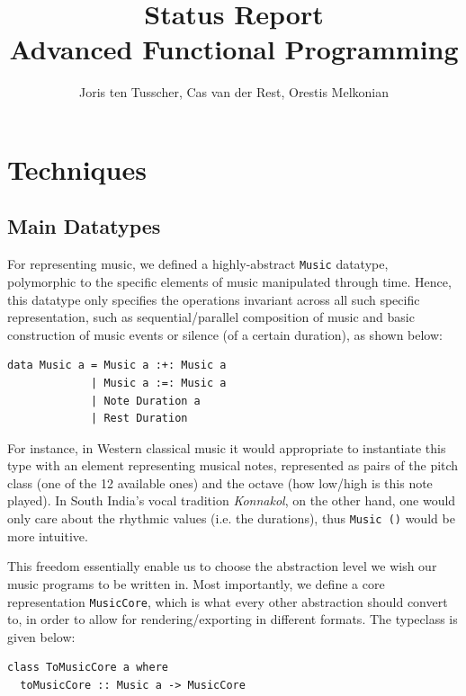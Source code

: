 \documentclass[11pt,a4paper]{article}
\title{\textbf{Status Report \\ \small{Advanced Functional Programming}}}
\author{\small{Joris ten Tusscher, Cas van der Rest, Orestis Melkonian}}
\date{}
\newcommand{\icode}[1]{\texttt{#1}}
\begin{document}
\maketitle

\section{Techniques}

\subsection{Main Datatypes}
For representing music, we defined a highly-abstract \icode{Music} datatype, polymorphic to the specific elements of music manipulated through time. Hence, this datatype only specifies the operations invariant across all such specific representation, such as sequential/parallel composition of music and basic construction of music events or silence (of a certain duration), as shown below:

\begin{center}\begin{minipage}{0.5\textwidth}\begin{verbatim}
data Music a = Music a :+: Music a
             | Music a :=: Music a
             | Note Duration a
             | Rest Duration
\end{verbatim}
\end{minipage}
\end{center}

For instance, in Western classical music it would appropriate to instantiate this type with an element representing
musical notes, represented as pairs of the pitch class (one of the 12 available ones) and the octave (how low/high is this note played). In South India's vocal tradition \textit{Konnakol}, on the other hand, one would only care about the rhythmic values (i.e. the durations), thus \icode{Music ()} would be more intuitive.

This freedom essentially enable us to choose the abstraction level we wish our music programs to be written in. Most importantly, we define a core representation \icode{MusicCore}, which is what every other abstraction should convert to, in order to allow for rendering/exporting in different formats. The typeclass is given below:

\begin{center}\begin{minipage}{0.5\textwidth}\begin{verbatim}
class ToMusicCore a where
  toMusicCore :: Music a -> MusicCore
\end{verbatim}
\end{minipage}
\end{center}
\end{document}
